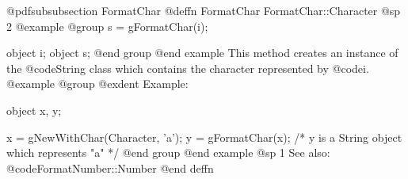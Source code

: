 @pdfsubsubsection {FormatChar}
@deffn {FormatChar} FormatChar::Character
@sp 2
@example
@group
s = gFormatChar(i);

object  i;
object  s;
@end group
@end example
This method creates an instance of the @code{String} class which
contains the character represented by @code{i}.
@example
@group
@exdent Example:

object  x, y;

x = gNewWithChar(Character, 'a');
y = gFormatChar(x);
/*  y is a String object which represents "a"  */
@end group
@end example
@sp 1
See also:  @code{FormatNumber::Number}
@end deffn







